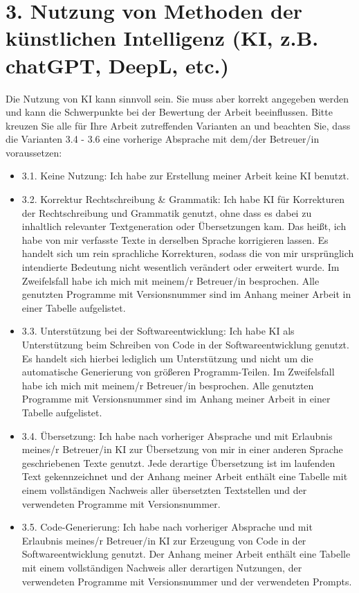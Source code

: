 \section*{3. Nutzung von Methoden der künstlichen Intelligenz (KI, z.B. chatGPT, DeepL, etc.)}

Die Nutzung von KI kann sinnvoll sein. Sie muss aber korrekt angegeben werden und kann die Schwerpunkte bei der Bewertung der Arbeit beeinflussen. Bitte kreuzen Sie alle für Ihre Arbeit zutreffenden Varianten an und beachten Sie, dass die Varianten 3.4 - 3.6 eine vorherige Absprache mit dem/der Betreuer/in voraussetzen:

\begin{itemize}[label={$\square$}]
    \item[\checkboxUnchecked] 3.1. Keine Nutzung: Ich habe zur Erstellung meiner Arbeit keine KI benutzt.
    \item[\checkboxUnchecked] 3.2. Korrektur Rechtschreibung \& Grammatik: Ich habe KI für Korrekturen der Rechtschreibung und Grammatik genutzt, ohne dass es dabei zu inhaltlich relevanter Textgeneration oder Übersetzungen kam. Das heißt, ich habe von mir verfasste Texte in derselben Sprache korrigieren lassen. Es handelt sich um rein sprachliche Korrekturen, sodass die von mir ursprünglich intendierte Bedeutung nicht wesentlich verändert oder erweitert wurde. Im Zweifelsfall habe ich mich mit meinem/r Betreuer/in besprochen. Alle genutzten Programme mit Versionsnummer sind im Anhang meiner Arbeit in einer Tabelle aufgelistet.
    \item[\checkboxUnchecked] 3.3. Unterstützung bei der Softwareentwicklung: Ich habe KI als Unterstützung beim Schreiben von Code in der Softwareentwicklung genutzt. Es handelt sich hierbei lediglich um Unterstützung und nicht um die automatische Generierung von größeren Programm-Teilen. Im Zweifelsfall habe ich mich mit meinem/r Betreuer/in besprochen. Alle genutzten Programme mit Versionsnummer sind im Anhang meiner Arbeit in einer Tabelle aufgelistet.
    \item[\checkboxUnchecked] 3.4. Übersetzung: Ich habe nach vorheriger Absprache und mit Erlaubnis meines/r Betreuer/in KI zur Übersetzung von mir in einer anderen Sprache geschriebenen Texte genutzt. Jede derartige Übersetzung ist im laufenden Text gekennzeichnet und der Anhang meiner Arbeit enthält eine Tabelle mit einem vollständigen Nachweis aller übersetzten Textstellen und der verwendeten Programme mit Versionsnummer.
    \item[\checkboxUnchecked] 3.5. Code-Generierung: Ich habe nach vorheriger Absprache und mit Erlaubnis meines/r Betreuer/in KI zur Erzeugung von Code in der Softwareentwicklung genutzt. Der Anhang meiner Arbeit enthält eine Tabelle mit einem vollständigen Nachweis aller derartigen Nutzungen, der verwendeten Programme mit Versionsnummer und der verwendeten Prompts.

\end{itemize}
